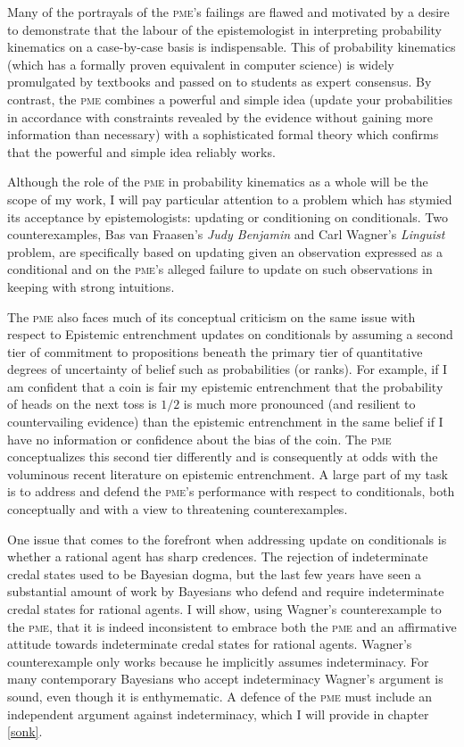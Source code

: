 Many of the portrayals of the \textsc{pme}'s failings are flawed and
motivated by a desire to demonstrate that the labour of the
epistemologist in interpreting probability kinematics on a
case-by-case basis is indispensable. This  of probability kinematics (which has a formally proven
equivalent in computer science) is widely promulgated by textbooks and
passed on to students as expert consensus. By contrast, the
\textsc{pme} combines a powerful and simple idea (update your
probabilities in accordance with constraints revealed by the evidence
without gaining more information than necessary) with a sophisticated
formal theory which confirms that the powerful and simple idea
reliably works.

Although the role of the \textsc{pme} in probability kinematics as a
whole will be the scope of my work, I will pay particular attention to
a problem which has stymied its acceptance by epistemologists:
updating or conditioning on conditionals. Two counterexamples, Bas van
Fraasen's \emph{Judy Benjamin} and Carl Wagner's \emph{Linguist}
problem, are specifically based on updating given an observation
expressed as a conditional and on the \textsc{pme}'s alleged failure
to update on such observations in keeping with strong intuitions.

The \textsc{pme} also faces much of its conceptual criticism on the
same issue with respect to  Epistemic
entrenchment updates on conditionals by assuming a second tier of
commitment to propositions beneath the primary tier of quantitative
degrees of uncertainty of belief such as probabilities (or ranks). For
example, if I am confident that a coin is fair my epistemic
entrenchment that the probability of heads on the next toss is $1/2$
is much more pronounced (and resilient to countervailing evidence)
than the epistemic entrenchment in the same belief if I have no
information or confidence about the bias of the coin. The \textsc{pme}
conceptualizes this second tier differently and is consequently at
odds with the voluminous recent literature on epistemic entrenchment.
A large part of my task is to address and defend the \textsc{pme}'s
performance with respect to conditionals, both conceptually and with a
view to threatening counterexamples.

One issue that comes to the forefront when addressing update on
conditionals is whether a rational agent has sharp credences. The
rejection of indeterminate credal states used to be Bayesian dogma,
but the last few years have seen a substantial amount of work by
Bayesians who defend and require indeterminate credal states for
rational agents. I will show, using Wagner's counterexample to the
\textsc{pme}, that it is indeed inconsistent to embrace both the
\textsc{pme} and an affirmative attitude towards indeterminate credal
states for rational agents. Wagner's counterexample only works because
he implicitly assumes indeterminacy. For many contemporary Bayesians
who accept indeterminacy Wagner's argument is sound, even though it is
enthymematic. A defence of the \textsc{pme} must include an
independent argument against indeterminacy, which I will provide in
chapter \ref{sonk}.

